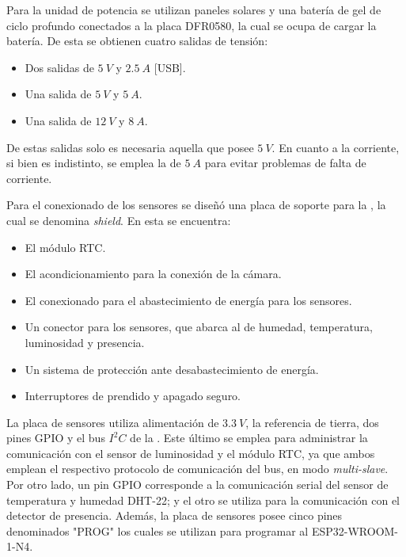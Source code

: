 
Para la unidad de potencia se utilizan paneles solares y una batería de gel de ciclo profundo conectados a la placa DFR0580, la cual se ocupa de cargar la batería. De esta se obtienen cuatro salidas de tensión:
\begin{itemize}
	\item Dos salidas de $5 \ V$ y $2.5 \ A$ [USB].
	\item Una salida de $5 \ V$ y $5 \ A$.
	\item Una salida de $12 \ V$ y $8 \ A$.
\end{itemize}
De estas salidas solo es necesaria aquella que posee $5 \ V$. En cuanto a la corriente, si bien es indistinto, se emplea la de $5 \ A$ para evitar problemas de falta de corriente.

Para el conexionado de los sensores se diseñó una placa de soporte para la \rspi, la cual se denomina \textit{shield}. En esta se encuentra:

\begin{itemize}
	\item El módulo RTC.
	\item El acondicionamiento para la conexión de la cámara.
	\item El conexionado para el abastecimiento de energía para los sensores.
	\item Un conector para los sensores, que abarca al de humedad, temperatura, luminosidad y presencia.
	\item Un sistema de protección ante desabastecimiento de energía.
	\item Interruptores de prendido y apagado seguro.
\end{itemize}

La placa de sensores utiliza alimentación de $3.3 \ V$, la referencia de tierra, dos pines GPIO y el bus $I^2C$ de la \rpi. Este último se emplea para administrar la comunicación con el sensor de luminosidad y el módulo RTC, ya que ambos emplean el respectivo protocolo de comunicación del bus, en modo \textit{multi-slave}. Por otro lado, un pin GPIO corresponde a la comunicación serial del sensor de temperatura y humedad DHT-22; y el otro se utiliza para la comunicación con el detector de presencia. Además, la placa de sensores posee cinco pines denominados "PROG" los cuales se utilizan para programar al ESP32-WROOM-1-N4.
 
